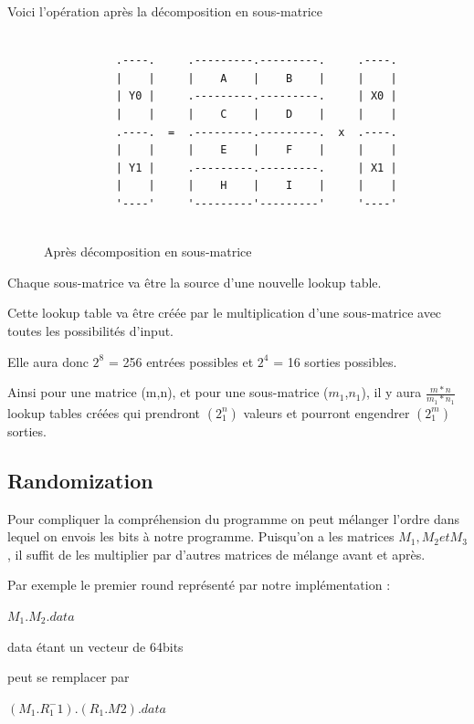 \documentclass[a4paper,12pt]{article}
\begin{document}
\clearpage

Voici l'opération après la décomposition en sous-matrice

\begin{figure}[h]
\begin{verbatim}

           .----.     .---------.---------.     .----.
           |    |     |    A    |    B    |     |    |
           | Y0 |     .---------.---------.     | X0 |
           |    |     |    C    |    D    |     |    |
           .----.  =  .---------.---------.  x  .----.
           |    |     |    E    |    F    |     |    |
           | Y1 |     .---------.---------.     | X1 |
           |    |     |    H    |    I    |     |    |
           '----'     '---------'---------'     '----'
           
\end{verbatim}
\caption{Après décomposition en sous-matrice}
\label{fig:ascii-box}
\end{figure}

\clearpage

Chaque sous-matrice va être la source d'une nouvelle lookup table.

Cette lookup table va être créée par le multiplication d'une sous-matrice avec toutes les possibilités d'input.

Elle aura donc $2^8$ = 256 entrées possibles et $2^4$ = 16 sorties possibles.

Ainsi pour une matrice (m,n), et pour une sous-matrice ($m_{1}$,$n_{1}$), il y aura     $\frac{m*n}{m_{1}*n_{1}}$ lookup tables créées qui prendront $(2^n_{1})$ valeurs et pourront engendrer $(2^m_{1})$ sorties.

\subsection{Randomization}

Pour compliquer la compréhension du programme on peut mélanger l'ordre dans lequel on envois les bits à notre programme. Puisqu'on a les matrices $M_1, M_2 et M_3$, il suffit de les multiplier par d'autres matrices de mélange avant et après.

Par exemple le premier round représenté par notre implémentation :

$M_1 . M_2 . data$

data étant un vecteur de 64bits

peut se remplacer par

$(M_1 . R_1^-1) . (R_1 . M2 ) . data$
\end{document}
